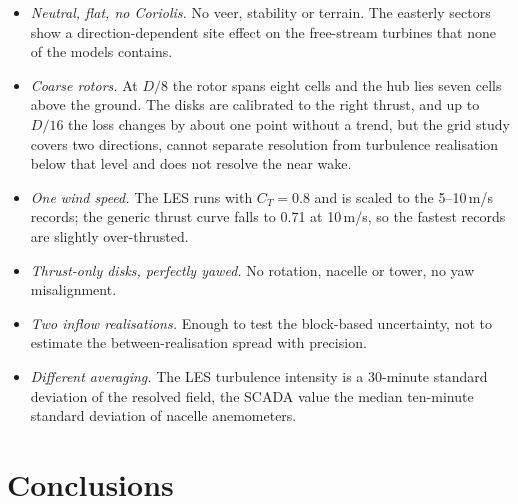 \documentclass[11pt,a4paper]{article}
\begin{document}
\begin{itemize}
  \item \emph{Neutral, flat, no Coriolis.} No veer, stability or terrain. The easterly sectors show a
        direction-dependent site effect on the free-stream turbines that none of the models contains.
  \item \emph{Coarse rotors.} At $D/8$ the rotor spans eight cells and the hub lies seven cells above the ground.
        The disks are calibrated to the right thrust, and up to $D/16$ the loss changes by about one point without
        a trend, but the grid study covers two directions, cannot separate resolution from turbulence realisation
        below that level and does not resolve the near wake.
  \item \emph{One wind speed.} The LES runs with $C_T = 0.8$ and is scaled to the 5--10\,m/s records; the generic
        thrust curve falls to 0.71 at 10\,m/s, so the fastest records are slightly over-thrusted.
  \item \emph{Thrust-only disks, perfectly yawed.} No rotation, nacelle or tower, no yaw misalignment.
  \item \emph{Two inflow realisations.} Enough to test the block-based uncertainty, not to estimate the
        between-realisation spread with precision.
  \item \emph{Different averaging.} The LES turbulence intensity is a 30-minute standard deviation of the resolved
        field, the SCADA value the median ten-minute standard deviation of nacelle anemometers.
\end{itemize}

\section{Conclusions}
\end{document}
